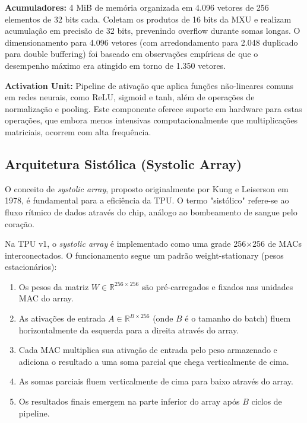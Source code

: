 \documentclass[12pt,a4paper]{article}
\begin{document}
\textbf{Acumuladores:} 4 MiB de memória organizada em 4.096 vetores de 256 elementos de 32 bits cada. Coletam os produtos de 16 bits da MXU e realizam acumulação em precisão de 32 bits, prevenindo overflow durante somas longas. O dimensionamento para 4.096 vetores (com arredondamento para 2.048 duplicado para double buffering) foi baseado em observações empíricas de que o desempenho máximo era atingido em torno de 1.350 vetores.

\textbf{Activation Unit:} Pipeline de ativação que aplica funções não-lineares comuns em redes neurais, como ReLU, sigmoid e tanh, além de operações de normalização e pooling. Este componente oferece suporte em hardware para estas operações, que embora menos intensivas computacionalmente que multiplicações matriciais, ocorrem com alta frequência.

\subsection{Arquitetura Sistólica (Systolic Array)}

O conceito de \textit{systolic array}, proposto originalmente por Kung e Leiserson em 1978, é fundamental para a eficiência da TPU. O termo "sistólico" refere-se ao fluxo rítmico de dados através do chip, análogo ao bombeamento de sangue pelo coração.

Na TPU v1, o \textit{systolic array} é implementado como uma grade 256×256 de MACs interconectados. O funcionamento segue um padrão weight-stationary (pesos estacionários):

\begin{enumerate}
\item Os pesos da matriz $W \in \mathbb{R}^{256 \times 256}$ são pré-carregados e fixados nas unidades MAC do array.

\item As ativações de entrada $A \in \mathbb{R}^{B \times 256}$ (onde $B$ é o tamanho do batch) fluem horizontalmente da esquerda para a direita através do array.

\item Cada MAC multiplica sua ativação de entrada pelo peso armazenado e adiciona o resultado a uma soma parcial que chega verticalmente de cima.

\item As somas parciais fluem verticalmente de cima para baixo através do array.

\item Os resultados finais emergem na parte inferior do array após $B$ ciclos de pipeline.
\end{enumerate}
\end{document}
